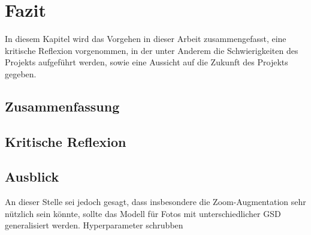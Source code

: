 \chapter{Fazit}

In diesem Kapitel wird das Vorgehen in dieser Arbeit zusammengefasst, eine kritische Reflexion vorgenommen, in der unter Anderem die Schwierigkeiten des Projekts aufgeführt werden, sowie eine Aussicht auf die Zukunft des Projekts gegeben. 

\section{Zusammenfassung}


\section{Kritische Reflexion}


\section{Ausblick}

An dieser Stelle sei jedoch gesagt, dass insbesondere die Zoom-Augmentation sehr nützlich sein könnte, 
sollte das Modell für Fotos mit unterschiedlicher \ac{GSD} generalisiert werden. 
Hyperparameter schrubben